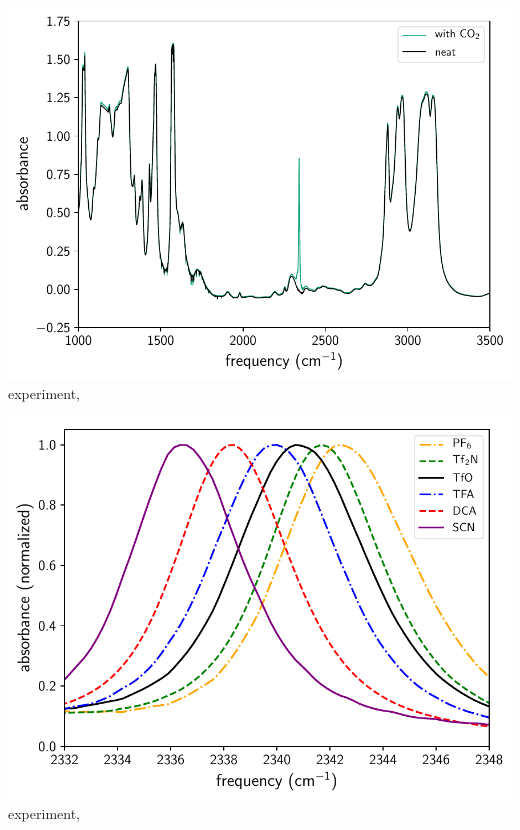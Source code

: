 \documentclass{beamer}
\begin{document}
\begin{frame}
  \centering
  \includegraphics[width=\linewidth,keepaspectratio]{./figures/experimental_spectra_TfO.pdf}
  \scriptsize
  experiment, \ce{[C4C1im][TfO]}
\end{frame}

\begin{frame}
  \centering
  \includegraphics[width=\linewidth,keepaspectratio]{./figures/experimental_spectra_shifting.pdf}
  \scriptsize
  experiment, \ce{[C4C1im]+}
\end{frame}
\end{document}

